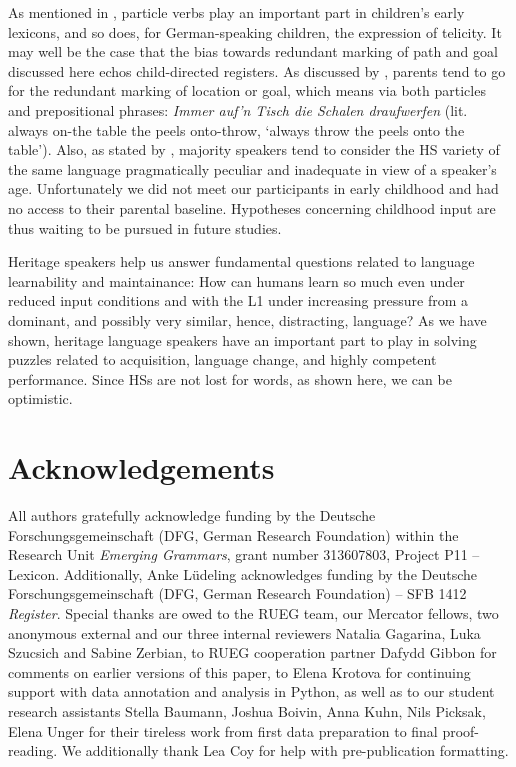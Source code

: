 \documentclass[output=paper,colorlinks,citecolor=brown]{langscibook}
\begin{document}
As mentioned in , particle verbs play an important part in children's early lexicons, and so does, for German-speaking children, the expression of telicity. It may well be the case that the bias towards redundant marking of path and goal discussed here echos child-directed registers. As discussed by \citet[177]{Bryant2018}, parents tend to go for the redundant marking of location or goal, which means via both particles and prepositional phrases: \textit{Immer auf’n Tisch die Schalen draufwerfen} (lit. always on-the table the peels onto-throw, `always throw the peels onto the table'). Also, as stated by \citet[291--328]{Polinsky2018HeritageLanguages}, majority speakers tend to consider the HS variety of the same language pragmatically peculiar and inadequate in view of a speaker’s age. Unfortunately we did not meet our participants in early childhood and had no access to their parental baseline. Hypotheses concerning childhood input are thus waiting to be pursued in future studies.

Heritage speakers help us answer fundamental questions related to language learnability and maintainance: How can humans learn so much even under reduced input conditions and with the L1 under increasing pressure from a dominant, and possibly very similar, hence, distracting, language? As we have shown, heritage language speakers have an important part to play in solving puzzles related to acquisition, language change, and highly competent performance. Since HSs are not lost for words, as shown here, we can be optimistic.


\section*{Acknowledgements} \label{sec:kelleretal:acknowledgements}

All authors gratefully acknowledge funding by the Deutsche Forschungsgemeinschaft (DFG, German Research Foundation) within the Research Unit \textit{Emerging Grammars}, grant number  313607803, Project P11 -- Lexicon. Additionally, Anke Lüdeling acknowledges funding by the Deutsche Forschungsgemeinschaft (DFG, German Research Foundation) – SFB 1412 \textit{Register}. Special thanks are owed to the RUEG team, our Mercator fellows, two anonymous external and our three internal reviewers Natalia Gagarina, Luka Szucsich and Sabine Zerbian, to RUEG cooperation partner Dafydd Gibbon for comments on earlier versions of this paper, to Elena Krotova for continuing support with data annotation and analysis in Python, as well as to our student research assistants Stella Baumann, Joshua Boivin, Anna Kuhn, Nils Picksak, Elena Unger for their tireless work from first data preparation to final proof-reading. We additionally thank Lea Coy for help with pre-publication formatting.
\end{document}
